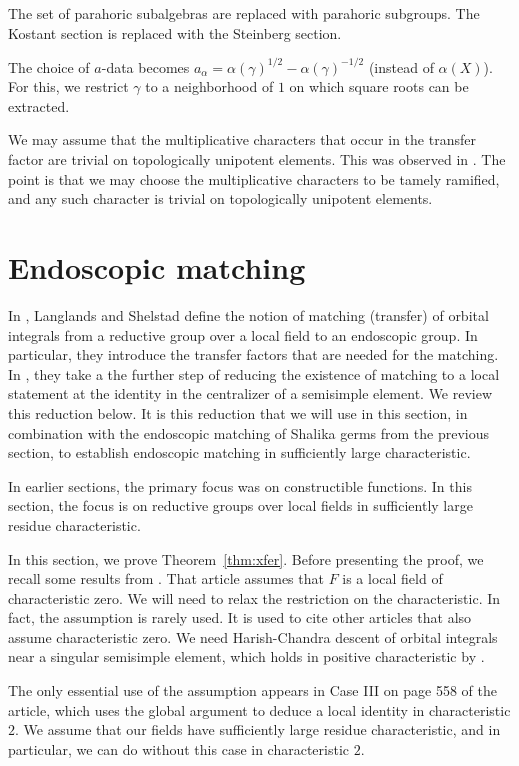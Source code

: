 \documentclass[12pt]{amsart}
\theoremstyle{plain}
\theoremstyle{definition}
\begin{document}
The set of parahoric subalgebras are replaced with parahoric subgroups.
The Kostant section is replaced with the Steinberg section.  

The
choice of $a$-data becomes $a_\alpha = \alpha(\gamma)^{1/2} -
\alpha(\gamma)^{-1/2}$ (instead of $\alpha(X)$).  For this, we
restrict $\gamma$ to a neighborhood of $1$ on which square roots can
be extracted.

We may assume that the multiplicative characters that occur in the
transfer factor are trivial on topologically unipotent elements.  This
was observed in \cite{hales1993simple}.  The point is that we may choose
the multiplicative characters to be tamely ramified, and any such
character is trivial on topologically unipotent elements.

\section{Endoscopic matching}

In \cite{LSxf}, Langlands and Shelstad define the notion of matching
(transfer) of orbital integrals from a reductive group over a local
field to an endoscopic group.  In particular, they introduce the
transfer factors that are needed for the matching.  In \cite{LSd},
they take a the further step of reducing the existence of matching to
a local statement at the identity in the centralizer of a semisimple
element.  We review this reduction below.  It is this reduction that
we will use in this section, in combination with the endoscopic
matching of Shalika germs from the previous section, to establish
endoscopic matching in sufficiently large characteristic.

In earlier sections, the primary focus was on constructible
functions.  In this section, the focus is on reductive groups over
local fields in sufficiently large residue characteristic.


In this section, we prove Theorem~\ref{thm:xfer}.
Before presenting the proof, we recall some results from \cite{LSd}.
That article assumes that $F$ is a local field of characteristic zero.
We will need to relax the restriction on the characteristic.  In fact,
the assumption is rarely used.  It is used to cite other articles that
also assume characteristic zero.  We need Harish-Chandra descent of
orbital integrals near a singular semisimple element, which holds in
positive characteristic by \cite{XX}.

The only essential use of the assumption appears in Case III on page
558 of the article, which uses the global argument to deduce a local
identity in characteristic $2$.  We assume that our fields have
sufficiently large residue characteristic, and in particular, we can
do without this case in characteristic $2$.
\end{document}
